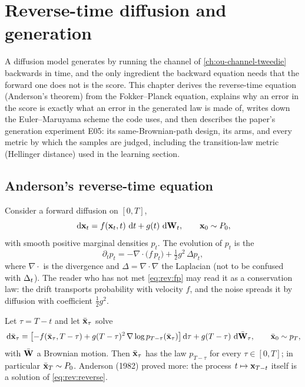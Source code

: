 \chapter{Reverse-time diffusion and generation}
\label{ch:reverse-sde-generation}

A diffusion model generates by running the channel of \cref{ch:ou-channel-tweedie}
backwards in time, and the only ingredient the backward equation needs that the
forward one does not is the score. This chapter derives the reverse-time equation
(Anderson's theorem) from the Fokker--Planck equation, explains why an error in the
score is exactly what an error in the generated law is made of, writes down the
Euler--Maruyama scheme the code uses, and then describes the paper's generation
experiment E05: its same-Brownian-path design, its arms, and every metric by which the
samples are judged, including the transition-law metric (Hellinger distance) used in
the learning section.

\section{Anderson's reverse-time equation}
\label{sec:rev:anderson}

Consider a forward diffusion on $[0,T]$,
\begin{equation}
  \,\mathrm{d}\mathbf{x}_t=f(\mathbf{x}_t,t)\,\,\mathrm{d} t+g(t)\,\,\mathrm{d}\mathbf{W}_t,\qquad \mathbf{x}_0\sim P_0,
  \label{eq:rev:forward}
\end{equation}
with smooth positive marginal densities $p_t$. The evolution of $p_t$ is the
\begin{equation}
  \partial_tp_t=-\nabla\cdot\bigl(f\,p_t\bigr)+\tfrac12g^2\,\Delta p_t ,
  \label{eq:rev:fp}
\end{equation}
where $\nabla\cdot$ is the divergence and $\Delta=\nabla\cdot\nabla$ the Laplacian
(not to be confused with $\Delta_t$). The reader who has not met \cref{eq:rev:fp} may read
it as a conservation law: the drift transports probability with velocity $f$, and the
noise spreads it by diffusion with coefficient $\tfrac12g^2$.

\begin{theorem}
\label{thm:rev:anderson}
Let $\tau=T-t$ and let $\bar{\mathbf{x}}_\tau$ solve
\begin{equation}
  \,\mathrm{d}\bar{\mathbf{x}}_\tau=\bigl[-f(\bar{\mathbf{x}}_\tau,T-\tau)+g(T-\tau)^2\,\nabla\log p_{T-\tau}(\bar{\mathbf{x}}_\tau)\bigr]\,\mathrm{d}\tau
   +g(T-\tau)\,\,\mathrm{d}\bar{\mathbf{W}}_\tau,\qquad \bar{\mathbf{x}}_0\sim p_T,
  \label{eq:rev:reverse}
\end{equation}
with $\bar{\mathbf{W}}$ a Brownian motion. Then $\bar{\mathbf{x}}_\tau$ has the law $p_{T-\tau}$
for every $\tau\in[0,T]$; in particular $\bar{\mathbf{x}}_T\sim P_0$. Anderson (1982) proved
more: the process $t\mapsto\mathbf{x}_{T-t}$ itself is a solution of \cref{eq:rev:reverse}.
\end{theorem}

